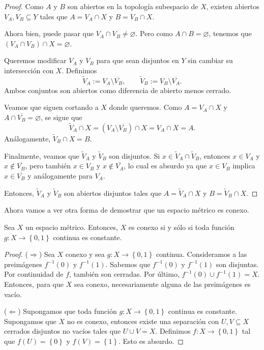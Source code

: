 \begin{proof}
	Como $A$ y $B$ son abiertos en la topología subespacio de $X$, existen abiertos $V_A, V_B \subseteq Y$ tales que $A = V_A \cap X$ y $B = V_B \cap X$.

	Ahora bien, puede pasar que $V_A \cap V_B \neq \varnothing$. Pero como $A \cap B = \varnothing$, tenemos que $(V_A \cap V_B) \cap X = \varnothing$.

	Queremos modificar $V_A$ y $V_B$ para que sean disjuntos en $Y$ sin cambiar su intersección con $X$. Definimos
	\[
		\widetilde{V}_A := V_A \setminus \overline{V_B}, \qquad \widetilde{V}_B := V_B \setminus \overline{V_A}.
	\]
	Ambos conjuntos son abiertos como diferencia de abierto menos cerrado.

	Veamos que siguen cortando a $X$ donde queremos. Como $A = V_A \cap X$ y $A \cap \overline{V_B} = \varnothing$, se sigue que
	\[
		\widetilde{V}_A \cap X = (V_A \setminus \overline{V_B}) \cap X = V_A \cap X = A.
	\]
	Análogamente, $\widetilde{V}_B \cap X = B$.

	Finalmente, veamos que $\widetilde{V}_A$ y $\widetilde{V}_B$ son disjuntos. Si $x \in \widetilde{V}_A \cap \widetilde{V}_B$, entonces $x \in V_A$ y $x \notin \overline{V_B}$, pero también $x \in V_B$ y $x \notin \overline{V_A}$, lo cual es absurdo ya que $x \in V_B$ implica $x \in \overline{V_B}$ y análogamente para $V_A$.

	Entonces, $\widetilde{V}_A$ y $\widetilde{V}_B$ son abiertos disjuntos tales que $A = \widetilde{V}_A \cap X$ y $B = \widetilde{V}_B \cap X$.
\end{proof}

Ahora vamos a ver otra forma de demostrar que un espacio métrico es conexo.

\begin{proposition}
	Sea $X$ un espacio métrico. Entonces, $X$ es conexo si y sólo si toda función $g : X \to \left\{ 0, 1 \right\}$ continua es constante.
\end{proposition}

\begin{proof}
	($\Rightarrow$) Sea $X$ conexo y sea $g : X \to \left\{ 0, 1 \right\}$ continua. Consideramos a las preimágenes $f^{-1}(0)$ y $f^{-1}(1)$. Sabemos que $f^{-1}(0)$ y $f^{-1}(1)$ son disjuntas. Por continuidad de $f$, también son cerradas. Por último, $f^{-1}(0) \cup f^{-1}(1) = X$. Entonces, para que $X$ sea conexo, necesariamente alguna de las preimágenes es vacío.

	($\Leftarrow$) Supongamos que toda función $g : X \to \left\{ 0, 1 \right\}$ continua es constante. Supongamos que $X$ no es conexo, entonces existe una separación con $U, V \subseteq X$ cerrados disjuntos no vacíos tales que $U \cup V = X$. Definimos $f : X \to \left\{ 0, 1 \right\}$ tal que $f(U) = \left\{ 0 \right\}$ y $f(V) = \left\{ 1 \right\}$. Esto es absurdo.
\end{proof}

